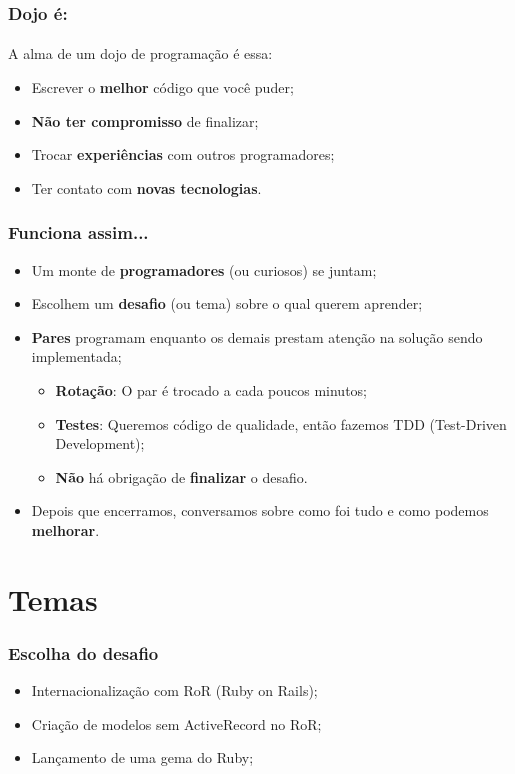 \documentclass{beamer}
\begin{document}
\begin{frame}
  \frametitle{Dojo é:}
  \framesubtitle{}
  A alma de um dojo de programação é essa:
  \begin{itemize}
    \item Escrever o \textbf{melhor} código que você puder;
    \item \textbf{Não ter compromisso} de finalizar;
    \item Trocar \textbf{experiências} com outros programadores;
    \item Ter contato com \textbf{novas tecnologias}.
  \end{itemize}
\end{frame}

\begin{frame}
  \frametitle{Funciona assim...}

  \begin{itemize}
    \item Um monte de \textbf{programadores} (ou curiosos) se juntam;
    \item Escolhem um \textbf{desafio} (ou tema) sobre o qual querem aprender;
    \item \textbf{Pares} programam enquanto os demais prestam atenção na solução sendo implementada;
      \begin{itemize}
        \item \textbf{Rotação}: O par é trocado a cada poucos minutos;
        \item \textbf{Testes}: Queremos código de qualidade, então fazemos TDD (Test-Driven Development);
        \item \textbf{Não} há obrigação de \textbf{finalizar} o desafio.
      \end{itemize}
    \item Depois que encerramos, conversamos sobre como foi tudo e como podemos \textbf{melhorar}.
  \end{itemize}
\end{frame}

\section{Temas}
\begin{frame}
  \frametitle{Escolha do desafio}

  \begin{itemize}
    \item Internacionalização com RoR (Ruby on Rails);
    \item Criação de modelos sem ActiveRecord no RoR;
    \item Lançamento de uma gema do Ruby;
  \end{itemize}
\end{frame}
\end{document}
